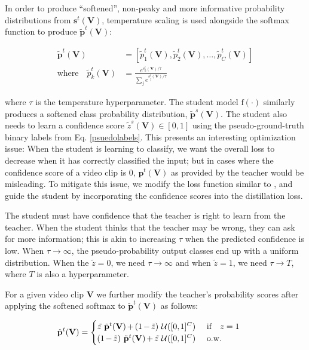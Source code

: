 \documentclass[a4paper,conference]{IEEEtran}
\begin{document}
In order to produce \enquote{softened}, non-peaky and more informative probability distributions from $\mathbf{s}^t(\mathbf{V})$, temperature scaling is used alongside the softmax function \cite{hinton2015distilling, guo2017calibration} to produce $\tilde{\mathbf{p}}^t(\mathbf{V})$:

\begin{align}
\tilde{\mathbf{p}}^t(\mathbf{V}) &= [\tilde{p}^t_1(\mathbf{V}), \tilde{p}^t_2(\mathbf{V}), \ldots, \tilde{p}^t_C(\mathbf{V})]\\
    \text{where}\quad \tilde{p}^t_k(\mathbf{V}) &= \frac{e^{s^t_k(\mathbf{V})/\tau}}{\sum_j e^{s^t_j(\mathbf{V})/\tau}}
\end{align}


where $\tau$ is the temperature hyperparameter. The student model $\mathrm{f}(\cdot)$ similarly produces a softened class probability distribution, $\tilde{\mathbf{p}}^s(\mathbf{V})$. The student also needs to learn a confidence score $\tilde{z}^s(\mathbf{V}) \in [0,1]$ using the pseudo-ground-truth binary labels from Eq. \ref{psuedolabels}. This presents an interesting optimization issue: When the student is learning to classify, we want the overall loss to decrease when it has correctly classified the input; but in cases where the confidence score of a video clip is 0, $\mathbf{p}^t(\mathbf{V})$ as provided by the teacher would be misleading. To mitigate this issue, we modify the loss function similar to \cite{kendall2017uncertainties, gurevich2018pairing, devries2018learning}, and guide the student by incorporating the confidence scores into the distillation loss. 

The student must have confidence that the teacher is right to learn from the teacher. When the student thinks that the teacher may be wrong, they can ask for more information; this is akin to increasing $\tau$ when the predicted confidence is low. When $\tau \rightarrow \infty$, the pseudo-probability output classes end up with a uniform distribution. When the $\tilde{z} = 0$, we need $\tau \rightarrow \infty$ and when $\tilde{z} = 1$, we need $\tau \rightarrow T$, where $T$ is also a hyperparameter.

For a given video clip $\mathbf{V}$ we further modify the teacher's probability scores after applying the softened softmax to $\tilde{\mathbf{p}}^t(\mathbf{V})$ as follows:


\begin{eqnarray}
\thinmuskip=\muexpr\thinmuskip*5/8\relax
\medmuskip=\muexpr\medmuskip*5/8\relax  
\hat{\mathbf{p}}^t(\mathbf{V}) =
\begin{cases} 
\begin{array}{cl}
\hspace{-.5em}\tilde{z~} \tilde{\mathbf{p}}^t(\mathbf{V}) + (1 - \tilde{z})~ \mathcal{U}([0,1]^C)  & \text{ if~~ } z=1\\
\hspace{-.5em}(1 - \tilde{z})~ \tilde{\mathbf{p}}^t(\mathbf{V}) + \tilde{z~} \mathcal{U}([0,1]^C) & \text{ o.w.}
\end{array}
\end{cases}
\label{eq5}
\end{eqnarray}
\end{document}
